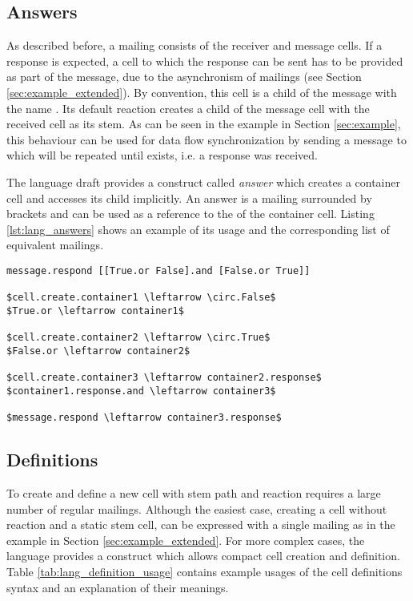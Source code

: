 \subsection{Answers}
As described before, a mailing consists of the receiver and message cells. If a response is expected, a cell to which the response can be sent has to be provided as part of the message, due to the asynchronism of mailings (see Section \ref{sec:example_extended}). By convention, this cell is a child of the message with the name . Its default reaction creates a child  of the message cell with the received cell as its stem. As can be seen in the example in Section \ref{sec:example}, this behaviour can be used for data flow synchronization by sending a message to  which will be repeated until  exists, i.e. a response was received.

The language draft provides a construct called \textit{answer} which creates a container cell and accesses its  child implicitly. An answer is a mailing surrounded by brackets and can be used as a reference to the  of the container cell. Listing \ref{lst:lang_answers} shows an example of its usage and the corresponding list of equivalent mailings.

\begin{lstlisting}[mathescape, float=hbt, label=lst:lang_answers, 
caption=Implicit answers and equivalent mailings]
message.respond [[True.or False].and [False.or True]]

$cell.create.container1 \leftarrow \circ.False$
$True.or \leftarrow container1$

$cell.create.container2 \leftarrow \circ.True$
$False.or \leftarrow container2$

$cell.create.container3 \leftarrow container2.response$
$container1.response.and \leftarrow container3$

$message.respond \leftarrow container3.response$
\end{lstlisting}


\subsection{Definitions}

To create and define a new cell with stem path and reaction requires a large number of regular mailings. Although the easiest case, creating a cell without reaction and a static stem cell, can be expressed with a single mailing as in the example in Section \ref{sec:example_extended}. For more complex cases, the language provides a construct which allows compact cell creation and definition. Table \ref{tab:lang_definition_usage} contains example usages of the cell definitions syntax and an explanation of their meanings.


